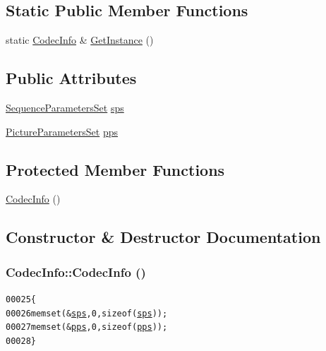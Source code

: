 \subsection*{Static Public Member Functions}
\begin{DoxyCompactItemize}
\item 
static \hyperlink{class_codec_info}{CodecInfo} \& \hyperlink{class_codec_info_ad439fd8062a03d868dfe9c9b615b747e}{GetInstance} ()
\end{DoxyCompactItemize}
\subsection*{Public Attributes}
\begin{DoxyCompactItemize}
\item 
\hyperlink{struct_sequence_parameters_set}{SequenceParametersSet} \hyperlink{class_codec_info_aee785011cec77ff3c0c646b498fe1e7d}{sps}
\item 
\hyperlink{struct_picture_parameters_set}{PictureParametersSet} \hyperlink{class_codec_info_abaa8d84a7d4045129ee64d91eaac4481}{pps}
\end{DoxyCompactItemize}
\subsection*{Protected Member Functions}
\begin{DoxyCompactItemize}
\item 
\hyperlink{class_codec_info_ab2ecf673aaa2480fafb0b3d22896e4b6}{CodecInfo} ()
\end{DoxyCompactItemize}


\subsection{Constructor \& Destructor Documentation}
\hypertarget{class_codec_info_ab2ecf673aaa2480fafb0b3d22896e4b6}{
\subsubsection[{CodecInfo}]{\setlength{\rightskip}{0pt plus 5cm}CodecInfo::CodecInfo ()}}
\label{class_codec_info_ab2ecf673aaa2480fafb0b3d22896e4b6}




\begin{footnotesize}\begin{alltt}
00025                     \{
00026                 memset(&\hyperlink{class_codec_info_aee785011cec77ff3c0c646b498fe1e7d}{sps}, 0, \textcolor{keyword}{sizeof}(\hyperlink{class_codec_info_aee785011cec77ff3c0c646b498fe1e7d}{sps}));
00027                 memset(&\hyperlink{class_codec_info_abaa8d84a7d4045129ee64d91eaac4481}{pps}, 0, \textcolor{keyword}{sizeof}(\hyperlink{class_codec_info_abaa8d84a7d4045129ee64d91eaac4481}{pps}));
00028         \}
\end{alltt}\end{footnotesize}




